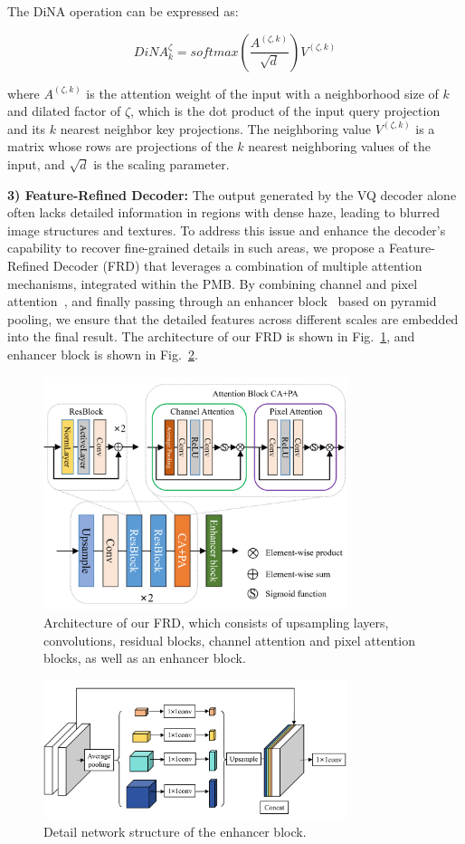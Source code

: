 \documentclass[journal]{IEEEtran}
\begin{document}
The DiNA operation can be expressed as:

\begin{equation}
	\label{NA_operation}
	DiNA^{\zeta}_{k} = softmax (\frac{A^{(\zeta, k)}}{\sqrt{d}}) V^{(\zeta, k)}
\end{equation}

where $A^{(\zeta, k)}$ is the attention weight of the input with a neighborhood size of $k$ and dilated factor of $\zeta$, which is the dot product of the input query projection and its $k$ nearest neighbor key projections. The neighboring value $V^{(\zeta, k)}$ is a matrix whose rows are projections of the $k$ nearest neighboring values of the input, and $\sqrt{d}$ is the scaling parameter.

	{\bf{3) Feature-Refined Decoder:}} The output generated by the VQ decoder alone often lacks detailed information in regions with dense haze, leading to blurred image structures and textures. To address this issue and enhance the decoder's capability to recover fine-grained details in such areas, we propose a Feature-Refined Decoder (FRD) that leverages a combination of multiple attention mechanisms, integrated within the PMB. By combining channel and pixel attention~\cite{qin2020ffa}, and finally passing through an enhancer block~\cite{qu2019enhanced} based on pyramid pooling, we ensure that the detailed features across different scales are embedded into the final result. The architecture of our FRD is shown in Fig.~\ref{fig3}, and enhancer block is shown in Fig.~\ref{fig4}.

\begin{figure}[!t]
	\centering
	\includegraphics[width=3.49in]{images/enhanced_decoder}
	\caption{Architecture of our FRD, which consists of upsampling layers, convolutions, residual blocks, channel attention and pixel attention blocks, as well as an enhancer block. }
	\label{fig3}
\end{figure}
\begin{figure}[!t]
	\centering
	\includegraphics[width=3.49in]{images/enhancer_block}
	\caption{Detail network structure of the enhancer block.}
	\label{fig4}
\end{figure}
\end{document}
